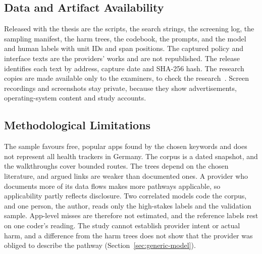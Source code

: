 \subsection{Data and Artifact Availability}
\label{sec:availability}
Released with the thesis are the scripts, the search strings, the screening log, the sampling
manifest, the harm trees, the codebook, the prompts, and the model and human labels with unit
IDs and span positions. The captured policy and interface texts are the providers' works and are
not republished. The release identifies each text by address, capture date and SHA-256 hash.
The research copies are made available only to the examiners, to check the
research~\parencite[\S~60d(4)]{urhg1965}. Screen recordings and screenshots stay private,
because they show advertisements, operating-system content and study accounts.

\subsection{Methodological Limitations}
\label{sec:limitations}
The sample favours free, popular apps found by the chosen keywords and does not represent all
health trackers in Germany. The corpus is a dated snapshot, and the walkthroughs cover bounded
routes. The trees depend on the chosen literature, and argued links are weaker than documented
ones. A provider who documents more of its data flows makes more pathways applicable, so
applicability partly reflects disclosure. Two correlated models code the corpus, and one person,
the author, reads only the high-stakes labels and the validation sample. App-level misses are
therefore not estimated, and the reference labels rest on one coder's reading. The study cannot establish provider intent or actual harm, and a difference from the
harm trees does not show that the provider was obliged to describe the pathway
(Section~\ref{sec:generic-model}).
